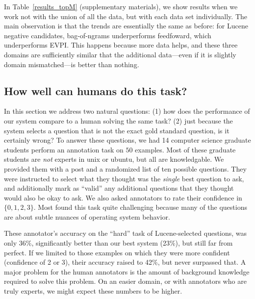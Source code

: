 \documentclass[11pt]{report}
\begin{document}
In Table~\ref{results_topM} (supplementary materials), we show results when we work not with the union of all the data, but with each data set individually.
The main observation is that the trends are essentially the same as before: for Lucene negative candidates, bag-of-ngrams underperforms feedfoward, which underperforms EVPI.
This happens because more data helps, and these three domains are sufficiently similar that the additional data---even if it is slightly domain mismatched---is better than nothing.

\subsection{How well can humans do this task?}

In this section we address two natural questions:
(1) how does the performance of our system compare to a human solving the same task?
(2) just because the system selects a question that is not the exact gold standard question, is it certainly wrong?
To answer these questions, we had 14 computer science graduate students perform an annotation task on $50$ examples.
Most of these graduate students are \emph{not} experts in unix or ubuntu, but all are knowledgable.
We provided them with a post and a randomized list of ten possible questions.
They were instructed to select what they thought was the \emph{single} best question to ask, and additionally mark as ``valid'' any additional questions that they thought would also be okay to ask.
We also asked annotators to rate their confidence in $\{0,1,2,3\}$.
Most found this task quite challenging because many of the questions are about subtle nuances of operating system behavior.

These annotator's accuracy on the ``hard'' task of Lucene-selected questions, was only 36\%, significantly better than our best system (23\%), but still far from perfect.
If we limited to those examples on which they were more confident (confidence of 2 or 3), their accuracy raised to 42\%, but never surpassed that.
A major problem for the human annotators is the amount of background knowledge required to solve this problem.
On an easier domain, or with annotators who are truly experts, we might expect these numbers to be higher.
\end{document}
